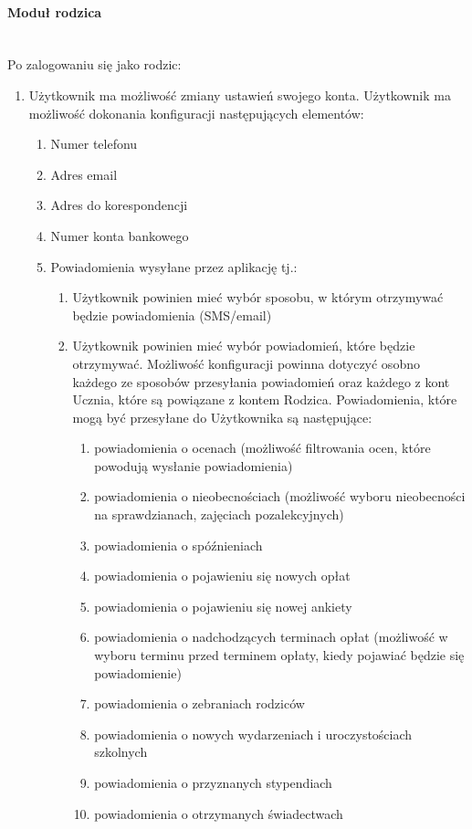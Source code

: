 \documentclass{article}
\begin{document}
\paragraph{Moduł rodzica} \mbox{}\\
Po zalogowaniu się jako rodzic:
\begin{enumerate}
	\item Użytkownik ma możliwość zmiany ustawień swojego konta. Użytkownik ma możliwość dokonania konfiguracji następujących elementów:
	\begin{enumerate}
		\item Numer telefonu
		\item Adres email
		\item Adres do korespondencji
		\item Numer konta bankowego
		\item Powiadomienia wysyłane przez aplikację tj.:
		\begin{enumerate}
			\item Użytkownik powinien mieć wybór sposobu, w którym otrzymywać będzie powiadomienia (SMS/email)
			\item Użytkownik powinien mieć wybór powiadomień, które będzie otrzymywać. Możliwość konfiguracji powinna dotyczyć osobno każdego ze sposobów przesyłania powiadomień oraz każdego z kont Ucznia, które są powiązane z kontem Rodzica. Powiadomienia, które mogą być przesyłane do Użytkownika są następujące:
			\begin{enumerate}
				\item powiadomienia o ocenach (możliwość filtrowania ocen, które powodują wysłanie powiadomienia)
				\item powiadomienia o nieobecnościach (możliwość wyboru nieobecności na sprawdzianach, zajęciach pozalekcyjnych)
				\item powiadomienia o spóźnieniach
				\item powiadomienia o pojawieniu się nowych opłat
				\item powiadomienia o pojawieniu się nowej ankiety
				\item powiadomienia o nadchodzących terminach opłat (możliwość w wyboru terminu przed terminem opłaty, kiedy pojawiać będzie się powiadomienie)
				\item powiadomienia o zebraniach rodziców
				\item powiadomienia o nowych wydarzeniach i uroczystościach szkolnych
				\item powiadomienia o przyznanych stypendiach
				\item powiadomienia o otrzymanych świadectwach

\end{enumerate}
\end{enumerate}
\end{enumerate}
\end{enumerate}
\end{document}
